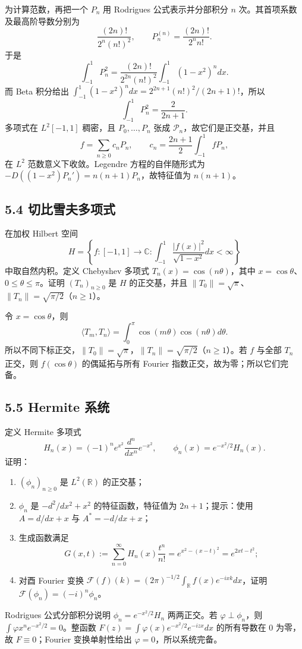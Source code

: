 为计算范数，再把一个 $P_n$ 用 Rodrigues 公式表示并分部积分 $n$ 次。其首项系数及最高阶导数分别为
\[
\frac{(2n)!}{2^n(n!)^2},\qquad P_n^{(n)}=\frac{(2n)!}{2^nn!}.
\]
于是
\[
\int_{-1}^1P_n^2
=\frac{(2n)!}{2^{2n}(n!)^2}\int_{-1}^1(1-x^2)^n dx.
\]
而 Beta 积分给出
$\int_{-1}^1(1-x^2)^n dx=2^{2n+1}(n!)^2/(2n+1)!$，所以
\[
\int_{-1}^1P_n^2=\frac2{2n+1}.
\]
多项式在 $L^2[-1,1]$ 稠密，且 $P_0,\ldots,P_n$ 张成 $\mathcal P_n$，故它们是正交基，并且
\[
f=\sum_{n\ge0}c_nP_n,\qquad c_n=\frac{2n+1}{2}\int_{-1}^1fP_n,
\]
在 $L^2$ 范数意义下收敛。Legendre 方程的自伴随形式为
$-D((1-x^2)P_n')=n(n+1)P_n$，故特征值为 $n(n+1)$。

\subsection*{5.4 切比雪夫多项式}
\begin{problem}
在加权 Hilbert 空间
\[
H=\left\{f:[-1,1]\to\mathbb C:
\int_{-1}^1\frac{|f(x)|^2}{\sqrt{1-x^2}}dx<\infty\right\}
\]
中取自然内积。定义 Chebyshev 多项式
$T_n(x)=\cos(n\theta)$，其中 $x=\cos\theta$、$0\le\theta\le\pi$。证明 $(T_n)_{n\ge0}$ 是 $H$ 的正交基，并且
$\|T_0\|=\sqrt\pi$、$\|T_n\|=\sqrt{\pi/2}$（$n\ge1$）。
\end{problem}
令 $x=\cos\theta$，则
\[
\langle T_m,T_n\rangle=\int_0^\pi\cos(m\theta)\cos(n\theta)d\theta.
\]
所以不同下标正交，$\|T_0\|=\sqrt\pi$，$\|T_n\|=\sqrt{\pi/2}$（$n\ge1$）。若 $f$ 与全部 $T_n$ 正交，则 $f(\cos\theta)$ 的偶延拓与所有 Fourier 指数正交，故为零；所以它们完备。

\subsection*{5.5 Hermite 系统}
\begin{problem}
定义 Hermite 多项式
\[
H_n(x)=(-1)^ne^{x^2}\frac{d^n}{dx^n}e^{-x^2},\qquad
\phi_n(x)=e^{-x^2/2}H_n(x).
\]
证明：
\begin{enumerate}[label=(\arabic*)]
\item $(\phi_n)_{n\ge0}$ 是 $L^2(\mathbb R)$ 的正交基；
\item $\phi_n$ 是 $-d^2/dx^2+x^2$ 的特征函数，特征值为 $2n+1$；提示：使用 $A=d/dx+x$ 与 $A^*=-d/dx+x$；
\item 生成函数满足
\[
G(x,t):=\sum_{n=0}^\infty H_n(x)\frac{t^n}{n!}
=e^{x^2-(x-t)^2}=e^{2xt-t^2};
\]
\item 对酉 Fourier 变换
$\mathcal F(f)(k)=(2\pi)^{-1/2}\int_{\mathbb R}f(x)e^{-ixk}dx$，证明
$\mathcal F(\phi_n)=(-i)^n\phi_n$。
\end{enumerate}
\end{problem}
Rodrigues 公式分部积分说明 $\phi_n=e^{-x^2/2}H_n$ 两两正交。若 $\varphi\perp\phi_n$，则
$\int\varphi x^ne^{-x^2/2}=0$。整函数
$F(z)=\int\varphi(x)e^{-x^2/2}e^{-izx}dx$ 的所有导数在 $0$ 为零，故 $F\equiv0$；Fourier 变换单射性给出 $\varphi=0$，所以系统完备。

